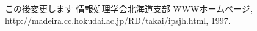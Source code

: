 







\begin{thebibliography}{99}
 この後変更します
 情報処理学会北海道支部 WWWホームページ,
http://madeira.cc.hokudai.ac.jp/RD/takai/ipsjh.html, 1997.
\end{thebibliography}

%
%
